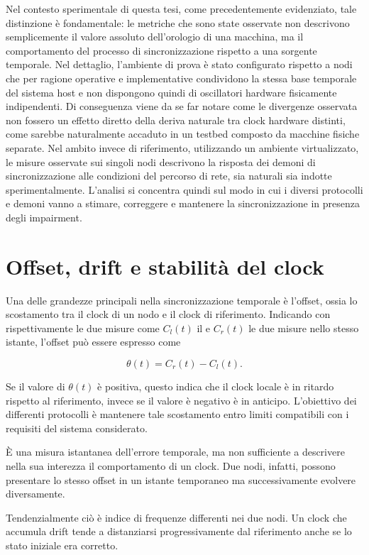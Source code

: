 Nel contesto sperimentale di questa tesi, come precedentemente evidenziato, tale distinzione
è fondamentale: le metriche che sono state osservate non descrivono
semplicemente il valore assoluto dell'orologio di una macchina, ma il comportamento
del processo di sincronizzazione rispetto a una sorgente temporale. Nel dettaglio, l'ambiente di prova è stato configurato rispetto a nodi
che per ragione operative e implementative condividono la stessa base temporale del
sistema host e non dispongono quindi di oscillatori hardware fisicamente indipendenti.
Di conseguenza viene da se far notare come le divergenze osservata non fossero
un effetto diretto della deriva naturale tra clock hardware distinti, come sarebbe
naturalmente accaduto in un testbed composto da macchine fisiche separate. Nel
ambito invece di riferimento, utilizzando un ambiente virtualizzato, le misure
osservate sui singoli nodi descrivono la risposta dei demoni di sincronizzazione
alle condizioni del percorso di rete, sia naturali sia indotte sperimentalmente.
L'analisi si concentra quindi sul modo in cui i diversi protocolli e demoni 
vanno a stimare, correggere e mantenere la sincronizzazione in presenza degli impairment.

\section{Offset, drift e stabilità del clock}
Una delle grandezze principali nella sincronizzazione temporale è l'offset,
ossia lo scostamento tra il clock di un nodo e il clock di riferimento. Indicando
con rispettivamente le due misure come $C_{l}(t)$ il e $C_{r}(t)$ le due misure nello
stesso istante, l'offset può essere espresso come

\[
  \theta(t) = C_{r}(t) - C_{l}(t).
\]

Se il valore di $\theta(t)$ è positiva, questo indica che il clock locale è in ritardo
rispetto al riferimento, invece se il valore è negativo è in anticipo. L'obiettivo
dei differenti protocolli è mantenere tale scostamento entro limiti compatibili
con i requisiti del sistema considerato.

È una misura istantanea dell'errore temporale, ma non sufficiente a descrivere
 nella sua interezza il comportamento di un clock. Due nodi, infatti, possono
presentare lo stesso offset in un istante temporaneo ma successivamente evolvere
diversamente.

Tendenzialmente ciò è indice di frequenze differenti nei due nodi.
Un clock che accumula drift tende a distanziarsi progressivamente
dal riferimento anche se lo stato iniziale era corretto.

